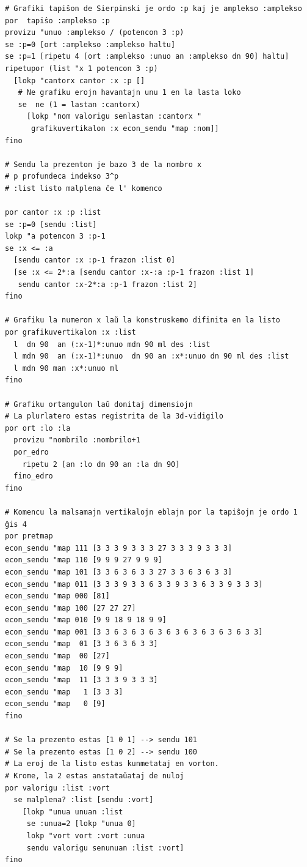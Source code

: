 \begin{verbatim}
# Grafiki tapiŝon de Sierpinski je ordo :p kaj je amplekso :amplekso
por  tapiŝo :amplekso :p
provizu "unuo :amplekso / (potencon 3 :p)
se :p=0 [ort :amplekso :amplekso haltu]
se :p=1 [ripetu 4 [ort :amplekso :unuo an :amplekso dn 90] haltu]
ripetupor (list "x 1 potencon 3 :p) 
  [lokp "cantorx cantor :x :p []
   # Ne grafiku erojn havantajn unu 1 en la lasta loko
   se  ne (1 = lastan :cantorx)  
     [lokp "nom valorigu senlastan :cantorx "
      grafikuvertikalon :x econ_sendu "map :nom]]  
fino

# Sendu la prezenton je bazo 3 de la nombro x
# p profundeca indekso 3^p
# :list listo malplena ĉe l' komenco

por cantor :x :p :list
se :p=0 [sendu :list] 
lokp "a potencon 3 :p-1
se :x <= :a 
  [sendu cantor :x :p-1 frazon :list 0] 
  [se :x <= 2*:a [sendu cantor :x-:a :p-1 frazon :list 1]
   sendu cantor :x-2*:a :p-1 frazon :list 2]
fino

# Grafiku la numeron x laŭ la konstruskemo difinita en la listo
por grafikuvertikalon :x :list
  l  dn 90  an (:x-1)*:unuo mdn 90 ml des :list
  l mdn 90  an (:x-1)*:unuo  dn 90 an :x*:unuo dn 90 ml des :list
  l mdn 90 man :x*:unuo ml
fino

# Grafiku ortangulon laŭ donitaj dimensiojn
# La plurlatero estas registrita de la 3d-vidigilo
por ort :lo :la
  provizu "nombrilo :nombrilo+1
  por_edro
    ripetu 2 [an :lo dn 90 an :la dn 90]
  fino_edro
fino

# Komencu la malsamajn vertikalojn eblajn por la tapiŝojn je ordo 1 ĝis 4
por pretmap
econ_sendu "map 111 [3 3 3 9 3 3 3 27 3 3 3 9 3 3 3]
econ_sendu "map 110 [9 9 9 27 9 9 9]
econ_sendu "map 101 [3 3 6 3 6 3 3 27 3 3 6 3 6 3 3]
econ_sendu "map 011 [3 3 3 9 3 3 6 3 3 9 3 3 6 3 3 9 3 3 3]
econ_sendu "map 000 [81]
econ_sendu "map 100 [27 27 27]
econ_sendu "map 010 [9 9 18 9 18 9 9]
econ_sendu "map 001 [3 3 6 3 6 3 6 3 6 3 6 3 6 3 6 3 6 3 3]
econ_sendu "map  01 [3 3 6 3 6 3 3]
econ_sendu "map  00 [27]
econ_sendu "map  10 [9 9 9]
econ_sendu "map  11 [3 3 3 9 3 3 3]
econ_sendu "map   1 [3 3 3]
econ_sendu "map   0 [9]
fino

# Se la prezento estas [1 0 1] --> sendu 101
# Se la prezento estas [1 0 2] --> sendu 100
# La eroj de la listo estas kunmetataj en vorton.
# Krome, la 2 estas anstataŭataj de nuloj
por valorigu :list :vort
  se malplena? :list [sendu :vort]
    [lokp "unua unuan :list
     se :unua=2 [lokp "unua 0] 
     lokp "vort vort :vort :unua
     sendu valorigu senunuan :list :vort]
fino


\end{verbatim}
